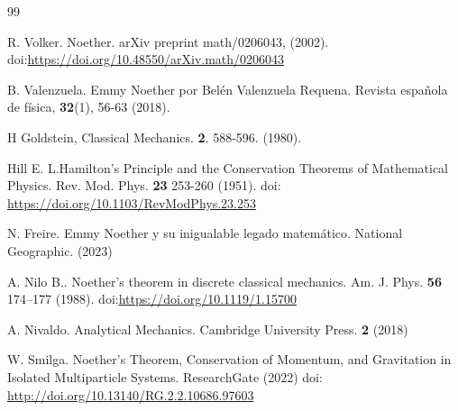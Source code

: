 \documentclass[a4paper,11pt]{article}
\begin{document}












\begin{thebibliography}{99}

 R. Volker. Noether. arXiv preprint math/0206043, (2002).    doi:\url{https://doi.org/10.48550/arXiv.math/0206043}


 B. Valenzuela. Emmy Noether por Belén Valenzuela Requena. Revista española de física, \textbf{32}(1), 56-63 (2018).

 H Goldstein, Classical Mechanics. \textbf{2}. 588-596. (1980).

 Hill E. L.Hamilton's Principle and the Conservation Theorems of Mathematical Physics. Rev. Mod. Phys. \textbf{23} 253-260 (1951). doi: \url{https://doi.org/10.1103/RevModPhys.23.253}

 N. Freire. Emmy Noether y su inigualable legado matemático. National Geographic. (2023)

 A. Nilo B.. Noether’s theorem in discrete classical mechanics. Am. J. Phys. \textbf{56} 174–177 (1988). 
doi:\url{https://doi.org/10.1119/1.15700}

 A. Nivaldo. Analytical Mechanics. Cambridge University Press. \textbf{2} (2018)

 W. Smilga. Noether's Theorem, Conservation of Momentum, and Gravitation in Isolated Multiparticle Systems. ResearchGate (2022)
doi: \url{http://doi.org/10.13140/RG.2.2.10686.97603}


\end{thebibliography}
\end{document}

